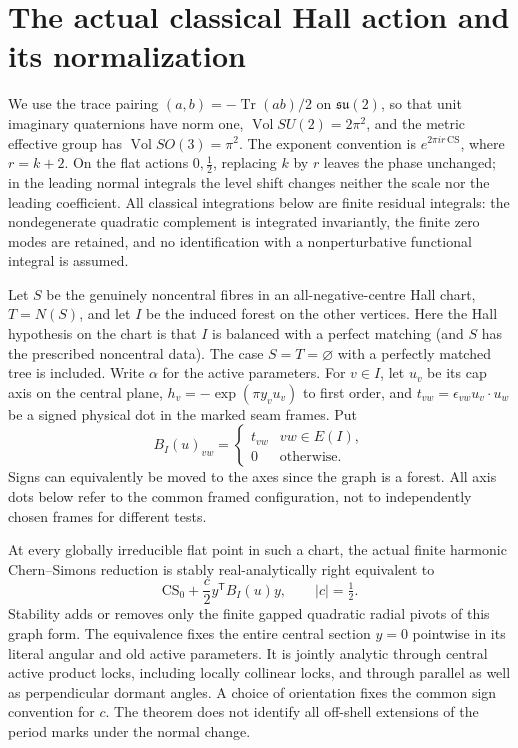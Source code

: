 \section{The actual classical Hall action and its normalization}
\label{classic:sec:action}

We use the trace pairing \((a,b)=-\operatorname{Tr}(ab)/2\) on
\(\mathfrak{su}(2)\), so that unit imaginary quaternions have norm one,
\(\operatorname{Vol}SU(2)=2\pi^2\), and the metric effective group has
\(\operatorname{Vol}SO(3)=\pi^2\).
The exponent convention is \(e^{2\pi i r\,\mathrm{CS}}\), where \(r=k+2\).
On the flat actions \(0,\frac12\), replacing \(k\) by \(r\) leaves the
phase unchanged; in the leading normal integrals the level shift changes
neither the scale nor the leading coefficient. All classical integrations
below are finite residual integrals: the nondegenerate quadratic complement
is integrated invariantly, the finite zero modes are retained, and no
identification with a nonperturbative functional integral is assumed.

Let \(S\) be the genuinely noncentral fibres in an all-negative-centre
Hall chart, \(T=N(S)\), and let \(I\) be the induced forest on the other
vertices. Here the Hall hypothesis on the chart is that \(I\) is balanced
with a perfect matching (and \(S\) has the prescribed noncentral data).
The case \(S=T=\varnothing\) with a perfectly matched tree is included.
Write \(\alpha\) for the active parameters. For
\(v\in I\), let \(u_v\) be its cap axis on the central plane,
\(h_v=-\exp(\pi y_v u_v)\) to first order, and
\(t_{vw}=\epsilon_{vw}u_v\cdot u_w\) be a signed physical dot in
the marked seam frames. Put
\[
 B_I(u)_{vw}=
 \begin{cases}t_{vw}&vw\in E(I),\\0&\text{otherwise}.\end{cases}
\]
Signs can equivalently be moved to the axes since the graph is a forest.
All axis dots below refer to the common framed configuration, not to
independently chosen frames for different tests.

\begin{theorem}
\label{classic:thm:hall-action}
At every globally irreducible flat point in such a chart, the actual
finite harmonic Chern--Simons reduction is stably real-analytically
right equivalent to
\begin{equation}
 \mathrm{CS}_0+\frac{c}{2}y^{\mathsf T}B_I(u)y,
 \qquad |c|=\tfrac12 .
 \label{classic:eq:normal}
\end{equation}
Stability adds or removes only the finite gapped quadratic radial
pivots of this graph form. The equivalence fixes the entire central
section \(y=0\) pointwise in its literal angular and old active
parameters. It is jointly analytic through central active product
locks, including locally collinear locks, and through parallel as well
as perpendicular dormant angles. A choice of orientation fixes the
common sign convention for \(c\). The theorem does not identify all
off-shell extensions of the period marks under the normal change.
\end{theorem}

